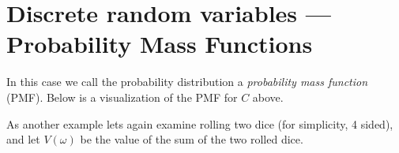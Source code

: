 \section{Discrete random variables --- Probability Mass Functions}
In this case we call the probability distribution a \emph{probability mass function} (PMF). 
Below is a visualization of the PMF for $C$ above. 

\begin{center}
\end{center}

As another example lets again examine rolling two dice (for simplicity, 4 sided), 
and let $V(\omega)$ be the value of the sum of the two rolled dice. 

